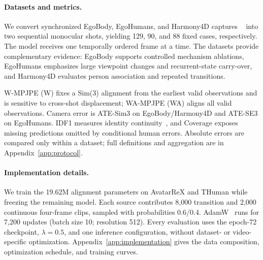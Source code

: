 \paragraph{Datasets and metrics.}
We convert synchronized EgoBody, EgoHumans, and Harmony4D captures
~\citep{zhang2022egobody,khirodkar2023egohumans,khirodkar2024harmony4d} into
two sequential monocular shots, yielding 129, 90, and 88 fixed cases,
respectively. The model receives one temporally ordered frame at a time. The
datasets provide complementary evidence: EgoBody supports controlled mechanism
ablations, EgoHumans emphasizes large viewpoint changes and recurrent-state
carry-over, and Harmony4D evaluates person association and repeated transitions.

W-MPJPE (W) fixes a Sim(3) alignment from the earliest valid observations and
is sensitive to cross-shot displacement; WA-MPJPE (WA) aligns all valid
observations. Camera error is ATE-Sim3 on EgoBody/Harmony4D and ATE-SE3 on
EgoHumans. IDF1 measures identity continuity~\citep{ristani2016performance},
and Coverage exposes missing predictions omitted by conditional human errors.
Absolute errors are compared only within a dataset; full definitions and
aggregation are in Appendix~\ref{app:protocol}.

\paragraph{Implementation details.}
We train the 19.62M alignment parameters on AvatarReX and THuman while freezing
the remaining model. Each source contributes 8,000 transition and 2,000
continuous four-frame clips, sampled with probabilities 0.6/0.4.
AdamW~\citep{loshchilov2019adamw} runs for 7,200 updates
(batch size 10; resolution 512). Every evaluation uses the epoch-72 checkpoint,
$\lambda=0.5$, and one inference configuration, without dataset- or
video-specific optimization. Appendix~\ref{app:implementation} gives the data
composition, optimization schedule, and training curves.

